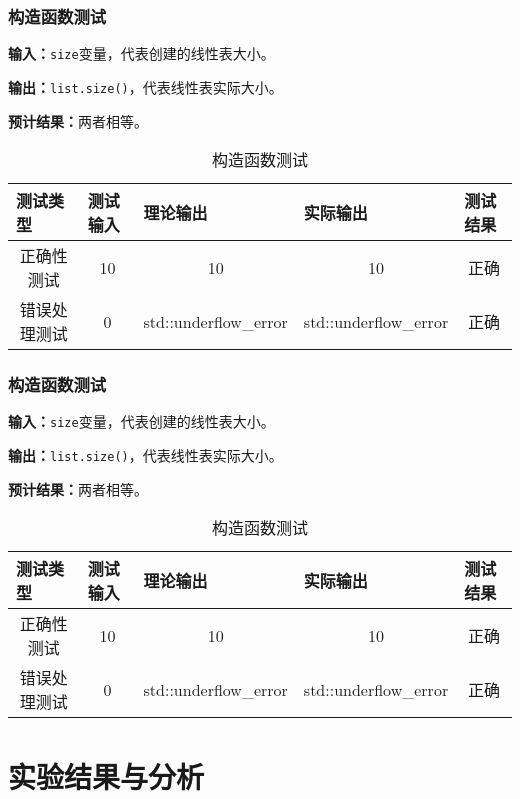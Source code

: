 \documentclass[format=draft,language=chinese,category=academic-report]{hustreport}
\begin{document}
\subsubsection{构造函数测试}
\textbf{输入：}\texttt{size}变量，代表创建的线性表大小。
\par
\textbf{输出：}\texttt{list.size()}，代表线性表实际大小。
\par
\textbf{预计结果：}两者相等。
\begin{table}[h]
    \centering
    \begin{tabular}{@{}ccccc@{}}
        \toprule
        \multicolumn{1}{l}{测试类型}    & \multicolumn{1}{l}{测试输入} & \multicolumn{1}{l}{理论输出} & \multicolumn{1}{l}{实际输出} &
        \multicolumn{1}{l}{测试结果} \\ \midrule
        \multicolumn{1}{c|}{正确性测试}  & 10&10&10&正确\\
        \multicolumn{1}{c|}{错误处理测试} & 0& std::underflow\_error& std::underflow\_error& 正确\\ \bottomrule
    \end{tabular}
    \caption{构造函数测试}
    \label{tab:inittest}
\end{table}

\subsubsection{构造函数测试}
\textbf{输入：}\texttt{size}变量，代表创建的线性表大小。
\par
\textbf{输出：}\texttt{list.size()}，代表线性表实际大小。
\par
\textbf{预计结果：}两者相等。
\begin{table}[h]
    \centering
    \begin{tabular}{@{}ccccc@{}}
        \toprule
        \multicolumn{1}{l}{测试类型}    & \multicolumn{1}{l}{测试输入} & \multicolumn{1}{l}{理论输出} & \multicolumn{1}{l}{实际输出} &
        \multicolumn{1}{l}{测试结果} \\ \midrule
        \multicolumn{1}{c|}{正确性测试}  & 10&10&10&正确\\
        \multicolumn{1}{c|}{错误处理测试} & 0& std::underflow\_error& std::underflow\_error& 正确\\ \bottomrule
    \end{tabular}
    \caption{构造函数测试}
    \label{tab:inittest}
\end{table}

\section{实验结果与分析}\label{sec:4}
\end{document}
